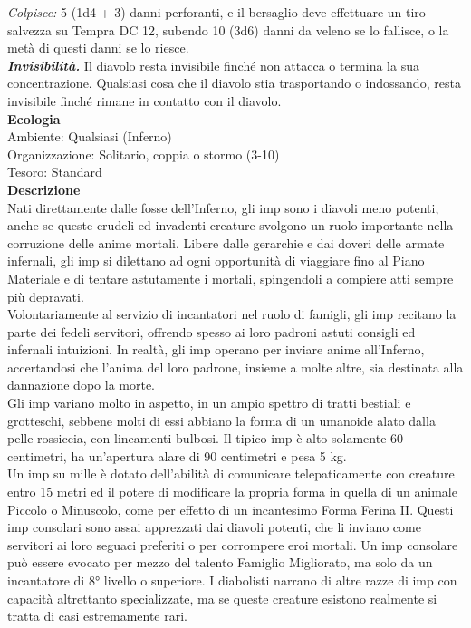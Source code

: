 \begin{multicols}{2}
\emph{Colpisce:} 5 (1d4 + 3) danni perforanti, e il bersaglio deve effettuare un tiro salvezza su Tempra DC  12, subendo 10 (3d6) danni da veleno se lo fallisce, o la metà di questi danni se lo riesce.\\
\emph{\textbf{Invisibilità.}} Il diavolo resta invisibile finché non attacca o termina la sua concentrazione. Qualsiasi cosa che il diavolo stia trasportando o indossando, resta invisibile finché rimane in contatto con il diavolo.\\
\textbf{Ecologia}\\
Ambiente: Qualsiasi (Inferno)\\
Organizzazione: Solitario, coppia o stormo (3-10)\\
Tesoro: Standard\\
\textbf{Descrizione}\\
Nati direttamente dalle fosse dell'Inferno, gli imp sono i diavoli meno potenti, anche se queste crudeli ed invadenti creature svolgono un ruolo importante nella corruzione delle anime mortali. Libere dalle gerarchie e dai doveri delle armate infernali, gli imp si dilettano ad ogni opportunità di viaggiare fino al Piano Materiale e di tentare astutamente i mortali, spingendoli a compiere atti sempre più depravati.\\

Volontariamente al servizio di incantatori nel ruolo di famigli, gli imp recitano la parte dei fedeli servitori, offrendo spesso ai loro padroni astuti consigli ed infernali intuizioni. In realtà, gli imp operano per inviare anime all'Inferno, accertandosi che l'anima del loro padrone, insieme a molte altre, sia destinata alla dannazione dopo la morte.\\

Gli imp variano molto in aspetto, in un ampio spettro di tratti bestiali e grotteschi, sebbene molti di essi abbiano la forma di un umanoide alato dalla pelle rossiccia, con lineamenti bulbosi. Il tipico imp è alto solamente 60 centimetri, ha un'apertura alare di 90 centimetri e pesa 5 kg.\\

Un imp su mille è dotato dell'abilità di comunicare telepaticamente con creature entro 15 metri ed il potere di modificare la propria forma in quella di un animale Piccolo o Minuscolo, come per effetto di un incantesimo Forma Ferina II. Questi imp consolari sono assai apprezzati dai diavoli potenti, che li inviano come servitori ai loro seguaci preferiti o per corrompere eroi mortali. Un imp consolare può essere evocato per mezzo del talento Famiglio Migliorato, ma solo da un incantatore di 8° livello o superiore. I diabolisti narrano di altre razze di imp con capacità altrettanto specializzate, ma se queste creature esistono realmente si tratta di casi estremamente rari.\\


\end{multicols}
